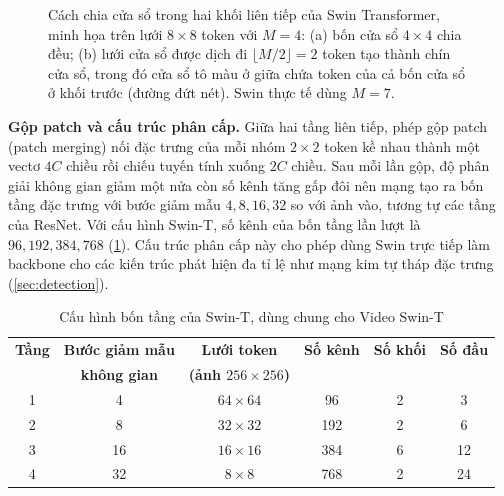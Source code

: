 \begin{figure}[htbp]
\centering
{}
\caption[Cửa sổ đều và cửa sổ dịch chuyển trong Swin Transformer]{Cách chia cửa sổ trong hai khối liên tiếp của Swin Transformer, minh họa trên lưới $8 \times 8$ token với $M = 4$: (a) bốn cửa sổ $4 \times 4$ chia đều; (b) lưới cửa sổ được dịch đi $\lfloor M/2 \rfloor = 2$ token tạo thành chín cửa sổ, trong đó cửa sổ tô màu ở giữa chứa token của cả bốn cửa sổ ở khối trước (đường đứt nét). Swin thực tế dùng $M = 7$.}
\label{fig:swin-window}
\end{figure}

\textbf{Gộp patch và cấu trúc phân cấp.} Giữa hai tầng liên tiếp, phép gộp patch (patch merging) nối đặc trưng của mỗi nhóm $2 \times 2$ token kề nhau thành một vectơ $4C$ chiều rồi chiếu tuyến tính xuống $2C$ chiều. Sau mỗi lần gộp, độ phân giải không gian giảm một nửa còn số kênh tăng gấp đôi nên mạng tạo ra bốn tầng đặc trưng với bước giảm mẫu $4, 8, 16, 32$ so với ảnh vào, tương tự các tầng của ResNet. Với cấu hình Swin-T, số kênh của bốn tầng lần lượt là $96, 192, 384, 768$ (\cref{tab:swin-stages}). Cấu trúc phân cấp này cho phép dùng Swin trực tiếp làm backbone cho các kiến trúc phát hiện đa tỉ lệ như mạng kim tự tháp đặc trưng (\cref{sec:detection}).

\begin{table}[htbp]
\centering
\caption{Cấu hình bốn tầng của Swin-T, dùng chung cho Video Swin-T}
\label{tab:swin-stages}
\small
\begin{tabular}{cccccc}
\toprule
\textbf{Tầng} & \textbf{Bước giảm mẫu} & \textbf{Lưới token} & \textbf{Số kênh} & \textbf{Số khối} & \textbf{Số đầu}\\
 & \textbf{không gian} & \textbf{(ảnh $256 \times 256$)} & & & \\
\midrule
1 & 4  & $64 \times 64$ & 96  & 2 & 3\\
2 & 8  & $32 \times 32$ & 192 & 2 & 6\\
3 & 16 & $16 \times 16$ & 384 & 6 & 12\\
4 & 32 & $8 \times 8$   & 768 & 2 & 24\\
\bottomrule
\end{tabular}
\end{table}

